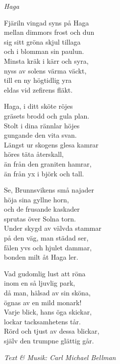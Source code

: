 {\footnotesize\textit{Haga}}\par
\vspace{10pt}
Fjäriln vingad syns på Haga\\
mellan dimmors frost och dun\\
sig sitt gröna skjul tillaga\\
och i blomman sin paulun.\\
Minsta kräk i kärr och syra,\\
nyss av solens värma väckt,\\
till en ny högtidlig yra\\
eldas vid zefirens fläkt.\par
\vspace{10pt}
Haga, i ditt sköte röjes\\
gräsets brodd och gula plan.\\
Stolt i dina rännlar höjes\\
gungande den vita svan.\\
Längst ur skogens glesa kamrar\\
höres täta återskall,\\
än från den graniten hamrar,\\
än från yx i björk och tall.\par
\vspace{10pt}
Se, Brunnsvikens små najader\\
höja sina gyllne horn,\\
och de frusande kaskader\\
sprutas över Solna torn.\\
Under skygd av välvda stammar\\
på den väg, man städad ser,\\
fålen yvs och hjulet dammar,\\
bonden milt åt Haga ler.\par
\vspace{10pt}
Vad gudomlig lust att röna\\
inom en så ljuvlig park,\\
då man, hälsad av sin sköna,\\
ögnas av en mild monark!\\
Varje blick, hans öga skickar,\\
lockar tacksamhetens tår.\\
Rörd och tjust av dessa blickar,\\
själv den trumpne glättig går.\par
\vspace{10pt}
{\footnotesize\textit{Text \& Musik: Carl Michael Bellman}}
